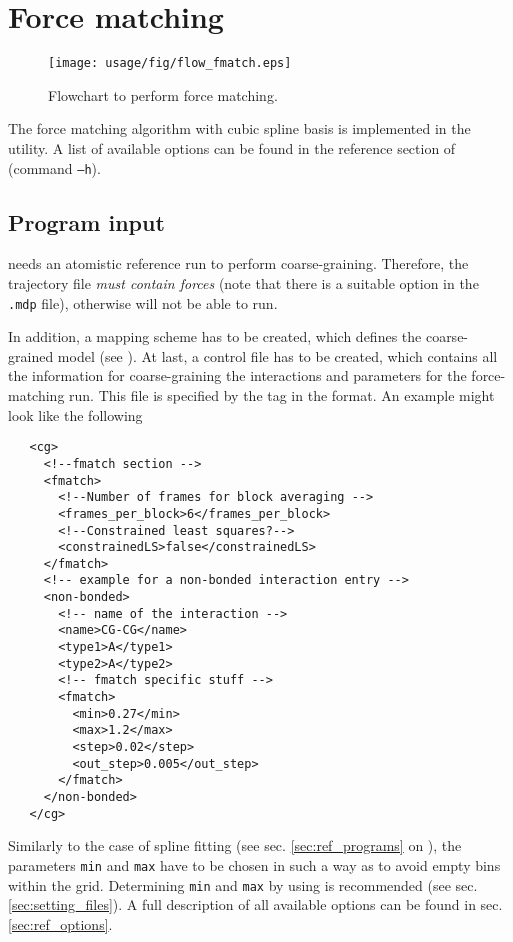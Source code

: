 \chapter{Force matching}
\begin{figure}
   \centering
   \texttt{[image: usage/fig/flow\_fmatch.eps]}
   \caption{Flowchart to perform force matching.}
\end{figure}
The force matching algorithm with cubic spline basis is implemented in the  utility. A list of available options can be found in the reference section of  (command \texttt{--h}).

\section{Program input}
 needs an atomistic reference run to perform coarse-graining. Therefore, the trajectory file {\em must contain forces } (note that there is a suitable option in the \gromacs \texttt{.mdp} file), otherwise  will not be able to run.

In addition, a mapping scheme has to be created, which defines the coarse-grained model (see ). At last, a control file has to be created, which contains all the information for coarse-graining the interactions and parameters for the force-matching run. This file is specified by the tag  in the \xml format. An example might look like the following
\begin{lstlisting}
   <cg>
     <!--fmatch section -->
     <fmatch>
       <!--Number of frames for block averaging -->
       <frames_per_block>6</frames_per_block>
       <!--Constrained least squares?-->
       <constrainedLS>false</constrainedLS>
     </fmatch>
     <!-- example for a non-bonded interaction entry -->
     <non-bonded>
       <!-- name of the interaction -->
       <name>CG-CG</name>
       <type1>A</type1>
       <type2>A</type2>
       <!-- fmatch specific stuff -->
       <fmatch>
         <min>0.27</min>
         <max>1.2</max>
         <step>0.02</step>
         <out_step>0.005</out_step>
       </fmatch>
     </non-bonded>
   </cg>
\end{lstlisting}
Similarly to the case of spline fitting (see sec. \ref{sec:ref_programs} on ), the parameters \texttt{min} and \texttt{max} have to be chosen in such a way as to avoid empty bins within the grid. Determining \texttt{min} and \texttt{max} by using  is recommended (see sec. \ref{sec:setting_files}). A full description of all available options can be found in sec. \ref{sec:ref_options}.

